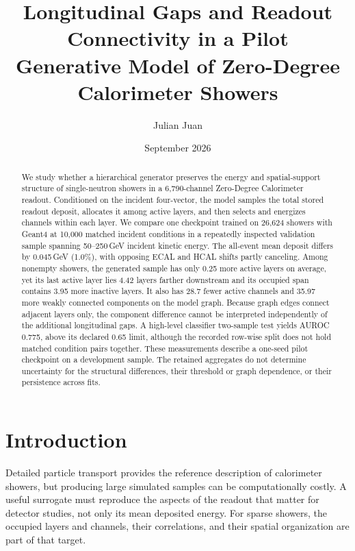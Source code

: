 \documentclass[11pt]{article}
\title{Longitudinal Gaps and Readout Connectivity in a Pilot\\Generative Model of Zero-Degree Calorimeter Showers}
\author{Julian Juan}
\date{September 2026}
\begin{document}
\maketitle

\begin{abstract}
We study whether a hierarchical generator preserves the energy and spatial-support structure of single-neutron showers in a 6,790-channel Zero-Degree Calorimeter readout. Conditioned on the incident four-vector, the model samples the total stored readout deposit, allocates it among active layers, and then selects and energizes channels within each layer. We compare one checkpoint trained on 26,624 showers with Geant4 at 10,000 matched incident conditions in a repeatedly inspected validation sample spanning 50--250\,GeV incident kinetic energy. The all-event mean deposit differs by 0.045\,GeV (1.0\%), with opposing ECAL and HCAL shifts partly canceling. Among nonempty showers, the generated sample has only 0.25 more active layers on average, yet its last active layer lies 4.42 layers farther downstream and its occupied span contains 3.95 more inactive layers. It also has 28.7 fewer active channels and 35.97 more weakly connected components on the model graph. Because graph edges connect adjacent layers only, the component difference cannot be interpreted independently of the additional longitudinal gaps. A high-level classifier two-sample test yields AUROC 0.775, above its declared 0.65 limit, although the recorded row-wise split does not hold matched condition pairs together. These measurements describe a one-seed pilot checkpoint on a development sample. The retained aggregates do not determine uncertainty for the structural differences, their threshold or graph dependence, or their persistence across fits.
\end{abstract}

\section{Introduction}

Detailed particle transport provides the reference description of calorimeter showers, but producing large simulated samples can be computationally costly. A useful surrogate must reproduce the aspects of the readout that matter for detector studies, not only its mean deposited energy. For sparse showers, the occupied layers and channels, their correlations, and their spatial organization are part of that target.
\end{document}

